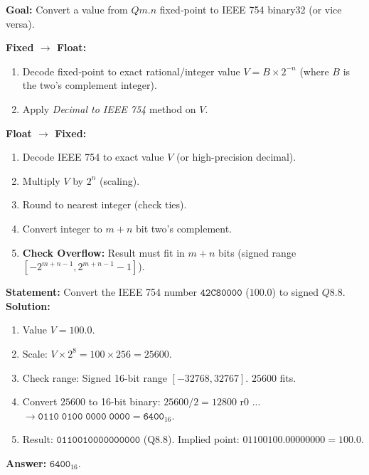 \documentclass[11pt]{article}
\begin{document}
\begin{methode}
\textbf{Goal:} Convert a value from $Qm.n$ fixed‑point to IEEE 754 binary32 (or vice versa).\par
\textbf{Fixed $\to$ Float:}
\begin{enumerate}
    \item Decode fixed‑point to exact rational/integer value $V = B \times 2^{-n}$ (where $B$ is the two's complement integer).
    \item Apply \emph{Decimal to IEEE 754} method on $V$.
\end{enumerate}
\textbf{Float $\to$ Fixed:}
\begin{enumerate}
    \item Decode IEEE 754 to exact value $V$ (or high-precision decimal).
    \item Multiply $V$ by $2^n$ (scaling).
    \item Round to nearest integer (check ties).
    \item Convert integer to $m+n$ bit two's complement.
    \item \textbf{Check Overflow:} Result must fit in $m+n$ bits (signed range $[-2^{m+n-1}, 2^{m+n-1}-1]$).
\end{enumerate}
\end{methode}

\begin{exoresolu}
\textbf{Statement:} Convert the IEEE 754 number $\mathtt{42C80000}$ ($100.0$) to signed $Q8.8$.
\tcblower
\textbf{Solution:}
\begin{enumerate}
    \item Value $V = 100.0$.
    \item Scale: $V \times 2^8 = 100 \times 256 = 25600$.
    \item Check range: Signed 16-bit range $[-32768, 32767]$. $25600$ fits.
    \item Convert $25600$ to 16-bit binary:
        $25600 / 2 = 12800$ r0 ... $\to \mathtt{0110\;0100\;0000\;0000} = \mathtt{6400}_{16}$.
    \item Result: $\mathtt{0110010000000000}$ (Q8.8). Implied point: $\mathtt{01100100.00000000} = 100.0$.
\end{enumerate}
\textbf{Answer:} $\mathtt{6400}_{16}$.
\end{exoresolu}
\end{document}
